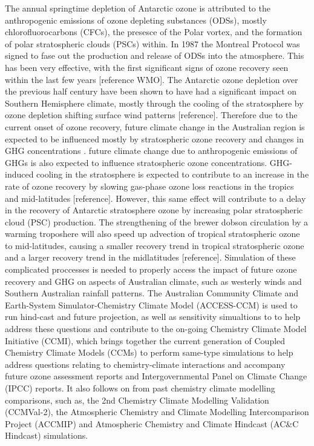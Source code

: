 The annual springtime depletion of Antarctic ozone is attributed to the anthropogenic emissions of ozone depleting substances (ODSs), mostly chlorofluorocarbons (CFCs), the presesce of the Polar vortex, and the formation of polar stratospheric clouds (PSCs) within. In 1987 the Montreal Protocol was signed to fase out the production and release of ODSs into the atmosphere. This has been very effective, with the first significant signs of ozone recovery seen within the last few years [reference WMO]. The Antarctic ozone depletion over the previous half century have been shown to have had a significant impact on Southern Hemisphere climate, mostly through the cooling of the stratosphere by ozone depletion shifting surface wind patterns [reference]. Therefore due to the current onset of ozone recovery, future climate change in the Australian region is expected to be influenced mostly by stratospheric ozone recovery and changes in GHG concentrations \citep{Arblaster:2011gk}. future climate change due to anthropogenic emissions of GHGs is also expected to influence stratospheric ozone concentrations. GHG-induced cooling in the stratosphere is expected to contribute to an increase in the rate of ozone recovery by slowing gas-phase ozone loss reactions in the tropics and mid-latitudes [reference]. However, this same effect will contribute to a delay in the recovery of Antarctic stratosphere ozone by increasing polar stratospheric cloud (PSC) production. The strengthening of the brewer dobson circulation by a warming troposhere will also speed up advection of tropical stratospheric ozone to mid-latitudes, causing a smaller recovery trend in tropical stratospheric ozone and a larger recovery trend in the midlatitudes [reference]. Simulation of these complicated proccesses is needed to properly access the impact of future ozone recovery and GHG on aspects of Australian climate, such as westerly winds and Southern Australian rainfall patterns. The Australian Community Climate and Earth-System Simulator-Chemistry Climate Model (ACCESS-CCM) is used to run hind-cast and future projection, as well as sensitivity simualtions to to help address these questions and contribute to the on-going Chemistry Climate Model Initiative (CCMI), which brings together the current generation of Coupled Chemistry Climate Models (CCMs) to perform same-type simulations to help address questions relating to chemistry-climate interactions and accompany future ozone assessment reports and Intergovernmental Panel on Climate Change (IPCC) reports. It also follows on from past chemistry climate modelling comparisons, such as, the 2nd Chemistry Climate Modelling Validation (CCMVal-2), the Atmospheric Chemistry and Climate Modelling Intercomparison Project (ACCMIP) and Atmospheric Chemistry and Climate Hindcast (AC&C Hindcast) simulations. 

